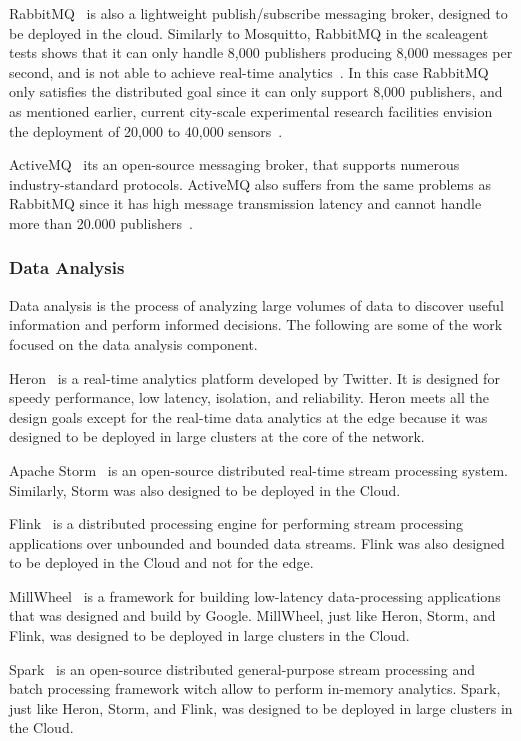 RabbitMQ~\cite{RabbitMQ} is also a lightweight publish/subscribe messaging broker, designed to be deployed in the cloud.
Similarly to Mosquitto, RabbitMQ in the scaleagent tests shows that it can only handle 8,000 publishers producing 8,000 messages per second, and is not able to achieve real-time analytics~\cite{mqtt}. In this case RabbitMQ only satisfies the distributed goal since it can only support 8,000 publishers, and as mentioned earlier, current city-scale experimental research facilities envision the deployment of 20,000 to 40,000 sensors~\cite{smartsantander}.

ActiveMQ~\cite{HiveMQ} its an open-source messaging broker, that supports numerous industry-standard protocols. ActiveMQ also suffers from the same problems as RabbitMQ since it has high message transmission latency and cannot handle more than 20.000 publishers~\cite{mqtt}.

\subsubsection{Data Analysis}

Data analysis is the process of analyzing large volumes of data to discover useful information and perform informed decisions. The following are some of the work focused on the data analysis component.

Heron~\cite{heron} is a real-time analytics platform developed by Twitter. It is designed for speedy performance, low latency, isolation, and reliability. Heron meets all the design goals except for the real-time data analytics at the edge because it was designed to be deployed in large clusters at the core of the network.

Apache Storm~\cite{storm} is an open-source distributed real-time stream processing system. Similarly, Storm was also designed to be deployed in the Cloud.

Flink~\cite{flink} is a distributed processing engine for performing stream processing applications over unbounded and bounded data streams. Flink was also designed to be deployed in the Cloud and not for the edge.

MillWheel~\cite{millwheel} is a framework for building low-latency data-processing applications that was designed and build by Google. MillWheel, just like Heron, Storm, and Flink, was designed to be deployed in large clusters in the Cloud.

Spark~\cite{spark} is an open-source distributed general-purpose stream processing and batch processing framework witch allow to perform in-memory analytics. Spark, just like Heron, Storm, and Flink, was designed to be deployed in large clusters in the Cloud.

